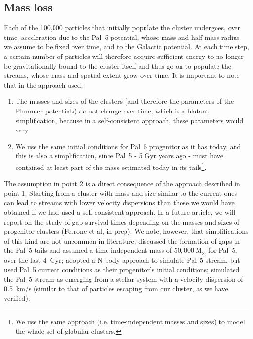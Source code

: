 \documentclass{aa}
\begin{document}
\subsection{Mass loss}

Each of the 100,000 particles that initially populate the cluster undergoes, over time, acceleration due to the Pal~5 potential, whose mass and half-mass radius we assume to be fixed over time, and to the Galactic potential. At each time step, a certain number of particles will therefore acquire sufficient energy to no longer be gravitationally bound to the cluster itself and thus go on to populate the streams, whose mass and spatial extent grow over time. It is important to note that in the approach used:

\begin{enumerate}
    \item The masses and sizes of the clusters (and therefore the parameters of the Plummer potentials) do not change over time, which is a blatant simplification, because in a self-consistent approach, these parameters would vary. 
    \item We use the same initial conditions for Pal~5 progenitor as it has today, and this is also a simplification, since Pal~5 - 5 Gyr years ago - must have contained at least part of the mass estimated today in its tails\footnote{We use the same approach (i.e. time-independent masses and sizes) to model the whole set of globular clusters.}. 
\end{enumerate}

The assumption in point 2 is a direct consequence of the approach described in point 1. Starting from a cluster with mass and size similar to the current ones can lead to streams with lower velocity dispersions than those we would have obtained if we had used a self-consistent approach. In a future article, we will report on the study of gap survival times depending on the masses and sizes of progenitor clusters (Ferrone et al, in prep). We note, however, that simplifications of this kind are not uncommon in literature. \citet{2017NatAs...1..633P} discussed the formation of gaps in the Pal~5 tails and assumed a time-independent mass of $50,000 ~\textrm{M}_\odot$ for Pal~5, over the last 4~Gyr; \citet{2017MNRAS.470...60E} adopted a N-body approach to simulate Pal~5 stream, but used Pal~5 current conditions as their progenitor's initial conditions; \citet{2019MNRAS.484.2009B} simulated the Pal~5 stream as emerging from a stellar system with a velocity dispersion of 0.5~km/s (similar to that of particles escaping from our cluster, as we have verified). 
\end{document}
